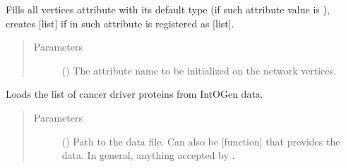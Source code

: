 \documentclass[letterpaper,10pt,english]{sphinxmanual}
\begin{document}
\begin{fulllineitems}
\begin{fulllineitems}
\label{\detokenize{main:pypath.main.PyPath.init_vertex_attr}}
Fills all vertices attribute  with its default type (if
such attribute value is ), creates {[}list{]} if in
 such attribute is
registered as {[}list{]}.
\begin{quote}\begin{description}
\item[{Parameters}] \leavevmode
{} () \textendash{} The attribute name to be initialized on the network
vertices.

\end{description}\end{quote}

\end{fulllineitems}


\begin{fulllineitems}
\label{\detokenize{main:pypath.main.PyPath.intergroup_shortest_paths}}
\end{fulllineitems}


\begin{fulllineitems}
\label{\detokenize{main:pypath.main.PyPath.intogen_cancer_drivers_list}}
Loads the list of cancer driver proteins from IntOGen data.
\begin{quote}\begin{description}
\item[{Parameters}] \leavevmode
{} () \textendash{} Path to the data file. Can also be {[}function{]} that provides
the data. In general, anything accepted by
.

\end{description}\end{quote}


\end{fulllineitems}
\end{fulllineitems}
\end{document}
